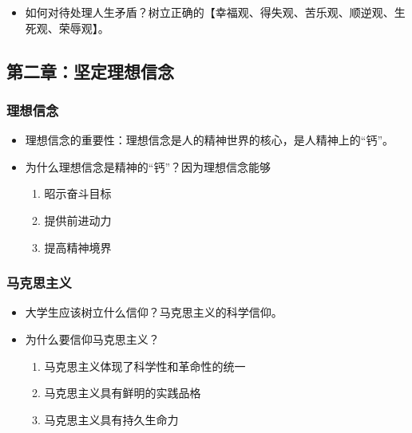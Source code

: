 \begin{itemize}
\tightlist
\item
  如何对待处理人生矛盾？树立正确的【幸福观、得失观、苦乐观、顺逆观、生死观、荣辱观】。
\end{itemize}

\hypertarget{ux7b2cux4e8cux7ae0ux575aux5b9aux7406ux60f3ux4fe1ux5ff5}{%
\subsection{第二章：坚定理想信念}\label{ux7b2cux4e8cux7ae0ux575aux5b9aux7406ux60f3ux4fe1ux5ff5}}

\hypertarget{ux7406ux60f3ux4fe1ux5ff5}{%
\subsubsection{理想信念}\label{ux7406ux60f3ux4fe1ux5ff5}}

\begin{itemize}
\tightlist
\item
  理想信念的重要性：理想信念是人的精神世界的核心，是人精神上的``钙''。
\item
  为什么理想信念是精神的``钙''？因为理想信念能够

  \begin{enumerate}
  \def\labelenumi{\arabic{enumi}.}
  \tightlist
  \item
    昭示奋斗目标
  \item
    提供前进动力
  \item
    提高精神境界
  \end{enumerate}
\end{itemize}

\hypertarget{ux9a6cux514bux601dux4e3bux4e49}{%
\subsubsection{马克思主义}\label{ux9a6cux514bux601dux4e3bux4e49}}

\begin{itemize}
\tightlist
\item
  大学生应该树立什么信仰？马克思主义的科学信仰。
\item
  为什么要信仰马克思主义？

  \begin{enumerate}
  \def\labelenumi{\arabic{enumi}.}
  \tightlist
  \item
    马克思主义体现了科学性和革命性的统一
  \item
    马克思主义具有鲜明的实践品格
  \item
    马克思主义具有持久生命力
  \end{enumerate}
\end{itemize}

